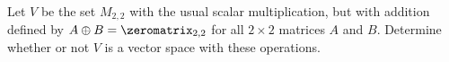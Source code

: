 %
Let $V$ be the set $M_{2,2}$ with the usual  scalar multiplication, but with addition defined by 
$A \oplus B = \zeromatrix_{2,2}$ for all $2 \times 2$ matrices $A$ and $B$.
Determine whether or not $V$ is a vector space with these operations. 